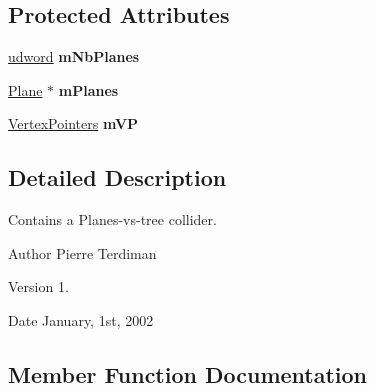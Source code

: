 \subsection*{Protected Attributes}
\begin{DoxyCompactItemize}
\item 
\hyperlink{IceTypes_8h_a44c6f1920ba5551225fb534f9d1a1733}{udword} {\bfseries m\+Nb\+Planes}\hypertarget{classPlanesCollider_ada2d9d9d4f1ae3a3a3a09d6fcfc8ab75}{}\label{classPlanesCollider_ada2d9d9d4f1ae3a3a3a09d6fcfc8ab75}

\item 
\hyperlink{classPlane}{Plane} $\ast$ {\bfseries m\+Planes}\hypertarget{classPlanesCollider_ad31d6c1211dabb827ffcd59af1e14a25}{}\label{classPlanesCollider_ad31d6c1211dabb827ffcd59af1e14a25}

\item 
\hyperlink{structVertexPointers}{Vertex\+Pointers} {\bfseries m\+VP}\hypertarget{classPlanesCollider_a3b4884a9474c29da9b95c20ebeee0840}{}\label{classPlanesCollider_a3b4884a9474c29da9b95c20ebeee0840}

\end{DoxyCompactItemize}


\subsection{Detailed Description}
Contains a Planes-\/vs-\/tree collider.

\begin{DoxyAuthor}{Author}
Pierre Terdiman 
\end{DoxyAuthor}
\begin{DoxyVersion}{Version}
1. 
\end{DoxyVersion}
\begin{DoxyDate}{Date}
January, 1st, 2002 
\end{DoxyDate}


\subsection{Member Function Documentation}
